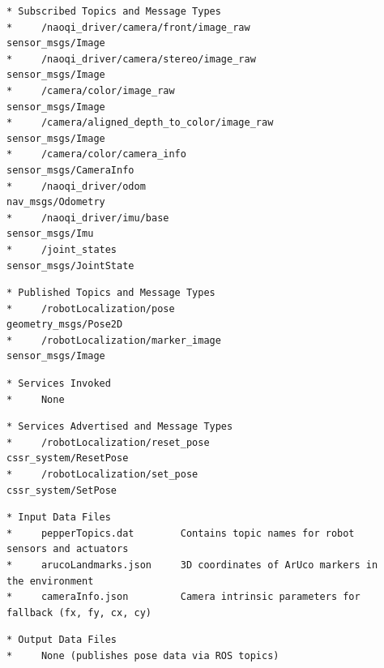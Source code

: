 \documentclass{CSSRforAfrica}
\newcommand{\checkboxChecked}{\fbox{\ding{51}}} %
\begin{document}
\begin{description}
\item[\checkboxChecked] 
{\small 
\begin{verbatim}
* Subscribed Topics and Message Types
*     /naoqi_driver/camera/front/image_raw         sensor_msgs/Image
*     /naoqi_driver/camera/stereo/image_raw        sensor_msgs/Image
*     /camera/color/image_raw                      sensor_msgs/Image
*     /camera/aligned_depth_to_color/image_raw     sensor_msgs/Image
*     /camera/color/camera_info                    sensor_msgs/CameraInfo
*     /naoqi_driver/odom                           nav_msgs/Odometry
*     /naoqi_driver/imu/base                       sensor_msgs/Imu
*     /joint_states                                sensor_msgs/JointState
\end{verbatim}}

\item[\checkboxChecked] 
{\small 
\begin{verbatim}                    
* Published Topics and Message Types
*     /robotLocalization/pose                      geometry_msgs/Pose2D
*     /robotLocalization/marker_image              sensor_msgs/Image
\end{verbatim}}

\item[\checkboxChecked]
{\small 
\begin{verbatim}
* Services Invoked
*     None
\end{verbatim}}

\item[\checkboxChecked]
{\small 
\begin{verbatim}
* Services Advertised and Message Types
*     /robotLocalization/reset_pose                cssr_system/ResetPose
*     /robotLocalization/set_pose                  cssr_system/SetPose
\end{verbatim}}

\item[\checkboxChecked] 
{\small 
\begin{verbatim}
* Input Data Files
*     pepperTopics.dat        Contains topic names for robot sensors and actuators
*     arucoLandmarks.json     3D coordinates of ArUco markers in the environment
*     cameraInfo.json         Camera intrinsic parameters for fallback (fx, fy, cx, cy)
\end{verbatim}}

\item[\checkboxChecked] 
{\small 
\begin{verbatim}
* Output Data Files
*     None (publishes pose data via ROS topics)
\end{verbatim}}


\end{description}
\end{document}
